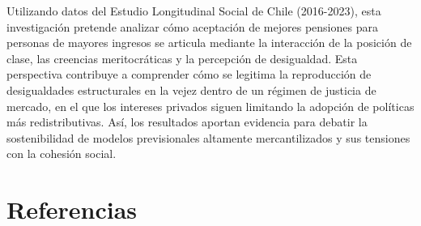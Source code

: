 \documentclass[
  12pt,
  letterpaper,
  DIV=11,
  numbers=noendperiod]{scrartcl}
\begin{document}
Utilizando datos del Estudio Longitudinal Social de Chile (2016-2023),
esta investigación pretende analizar cómo aceptación de mejores
pensiones para personas de mayores ingresos se articula mediante la
interacción de la posición de clase, las creencias meritocráticas y la
percepción de desigualdad. Esta perspectiva contribuye a comprender cómo
se legitima la reproducción de desigualdades estructurales en la vejez
dentro de un régimen de justicia de mercado, en el que los intereses
privados siguen limitando la adopción de políticas más redistributivas.
Así, los resultados aportan evidencia para debatir la sostenibilidad de
modelos previsionales altamente mercantilizados y sus tensiones con la
cohesión social.

\section{Referencias}\label{referencias}
\end{document}
